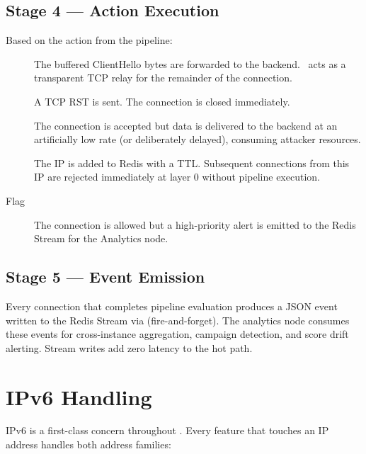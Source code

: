 \subsection{Stage 4 — Action Execution}

Based on the action from the pipeline:

\begin{description}
  \item[\badgeallow] The buffered ClientHello bytes are forwarded to the backend. \ja\
    acts as a transparent TCP relay for the remainder of the connection.
  \item[\badgeblock] A TCP RST is sent. The connection is closed immediately.
  \item[\badgetarpit] The connection is accepted but data is delivered to the backend
    at an artificially low rate (or deliberately delayed), consuming attacker resources.
  \item[\badgeban] The IP is added to Redis with a TTL. Subsequent connections from
    this IP are rejected immediately at layer 0 without pipeline execution.
  \item[Flag] The connection is allowed but a high-priority alert is emitted to the
    Redis Stream for the Analytics node.
\end{description}

\subsection{Stage 5 — Event Emission}

Every connection that completes pipeline evaluation produces a JSON event written to
the \code{events} Redis Stream via \code{XADD} (fire-and-forget). The analytics node
consumes these events for cross-instance aggregation, campaign detection, and score
drift alerting. Stream writes add zero latency to the hot path.

\section{IPv6 Handling}

IPv6 is a first-class concern throughout \ja. Every feature that touches an IP address
handles both address families:

